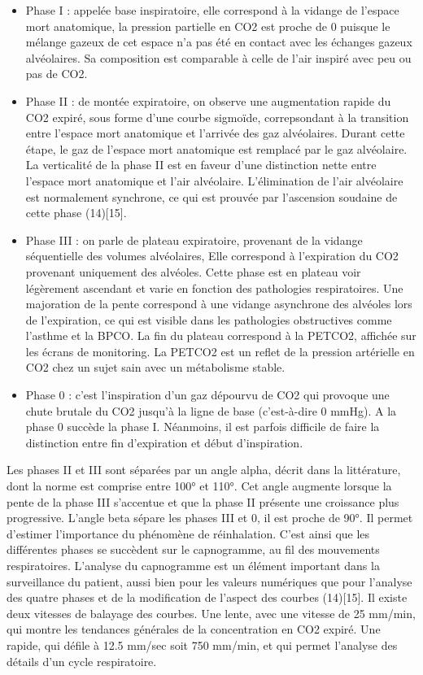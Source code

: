 \documentclass[12pt,]{article}
\providecommand{\tightlist}{%
  \setlength{\itemsep}{0pt}\setlength{\parskip}{0pt}}
\begin{document}
\begin{itemize}
\tightlist
\item
  Phase I : appelée base inspiratoire, elle correspond à la vidange de
  l'espace mort anatomique, la pression partielle en CO2 est proche de 0
  puisque le mélange gazeux de cet espace n'a pas été en contact avec
  les échanges gazeux alvéolaires. Sa composition est comparable à celle
  de l'air inspiré avec peu ou pas de CO2.
\item
  Phase II : de montée expiratoire, on observe une augmentation rapide
  du CO2 expiré, sous forme d'une courbe sigmoïde, correpsondant à la
  transition entre l'espace mort anatomique et l'arrivée des gaz
  alvéolaires. Durant cette étape, le gaz de l'espace mort anatomique
  est remplacé par le gaz alvéolaire. La verticalité de la phase II est
  en faveur d'une distinction nette entre l'espace mort anatomique et
  l'air alvéolaire. L'élimination de l'air alvéolaire est normalement
  synchrone, ce qui est prouvée par l'ascension soudaine de cette phase
  (14){[}15{]}.
\item
  Phase III : on parle de plateau expiratoire, provenant de la vidange
  séquentielle des volumes alvéolaires, Elle correspond à l'expiration
  du CO2 provenant uniquement des alvéoles. Cette phase est en plateau
  voir légèrement ascendant et varie en fonction des pathologies
  respiratoires. Une majoration de la pente correspond à une vidange
  asynchrone des alvéoles lors de l'expiration, ce qui est visible dans
  les pathologies obstructives comme l'asthme et la BPCO. La fin du
  plateau correspond à la PETCO2, affichée sur les écrans de monitoring.
  La PETCO2 est un reflet de la pression artérielle en CO2 chez un sujet
  sain avec un métabolisme stable.
\item
  Phase 0 : c'est l'inspiration d'un gaz dépourvu de CO2 qui provoque
  une chute brutale du CO2 jusqu'à la ligne de base (c'est-à-dire 0
  mmHg). A la phase 0 succède la phase I. Néanmoins, il est parfois
  difficile de faire la distinction entre fin d'expiration et début
  d'inspiration.
\end{itemize}

Les phases II et III sont séparées par un angle alpha, décrit dans la
littérature, dont la norme est comprise entre 100° et 110°. Cet angle
augmente lorsque la pente de la phase III s'accentue et que la phase II
présente une croissance plus progressive. L'angle beta sépare les phases
III et 0, il est proche de 90°. Il permet d'estimer l'importance du
phénomène de réinhalation. C'est ainsi que les différentes phases se
succèdent sur le capnogramme, au fil des mouvements respiratoires.
L'analyse du capnogramme est un élément important dans la surveillance
du patient, aussi bien pour les valeurs numériques que pour l'analyse
des quatre phases et de la modification de l'aspect des courbes
(14){[}15{]}. Il existe deux vitesses de balayage des courbes. Une
lente, avec une vitesse de 25 mm/min, qui montre les tendances générales
de la concentration en CO2 expiré. Une rapide, qui défile à 12.5 mm/sec
soit 750 mm/min, et qui permet l'analyse des détails d'un cycle
respiratoire.
\end{document}
